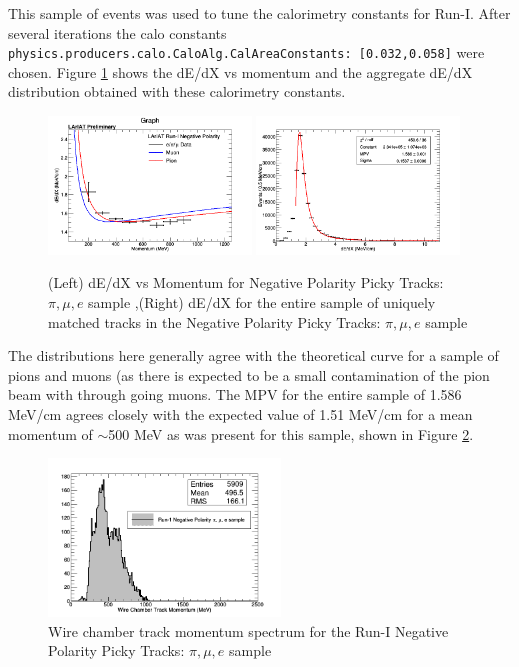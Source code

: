 This sample of events was used to tune the calorimetry constants for Run-I. After several iterations the calo constants \verb!physics.producers.calo.CaloAlg.CalAreaConstants: [0.032,0.058]! were chosen. Figure \ref{fig:Run1NegPickyTrkPiMuEResults} shows the dE/dX vs momentum and the aggregate dE/dX distribution obtained with these calorimetry constants.

\begin{figure}[htb]
\centering
\includegraphics[width=0.48\textwidth]{images/dEdXvsMomentumNegPolRun1FineBin2.png}
\includegraphics[width=0.48\textwidth]{images/dEdXNegPolRun1.png}
\caption{(Left) dE/dX vs Momentum for Negative Polarity Picky Tracks: $\pi, \mu, e$ sample ,(Right) dE/dX for the entire sample of uniquely matched tracks in the Negative Polarity Picky Tracks: $\pi, \mu, e$ sample }
\label{fig:Run1NegPickyTrkPiMuEResults}
\end{figure}

The distributions here generally agree with the theoretical curve for a sample of pions and muons (as there is expected to be a small contamination of the pion beam with through going muons. The MPV for the entire sample of 1.586 MeV/cm agrees closely with the expected value of 1.51 MeV/cm for a mean momentum of $\sim$500 MeV as was present for this sample, shown in Figure \ref{fig:Run1NegPickyTrkPiMuEMomentumSpec}.

\begin{figure}[htb]
\centering
\includegraphics[width=0.55\textwidth]{images/WCTrkMomentumRun1NegPiMuE.png}
\caption{Wire chamber track momentum spectrum for the Run-I Negative Polarity Picky Tracks: $\pi, \mu, e$ sample  }
\label{fig:Run1NegPickyTrkPiMuEMomentumSpec}
\end{figure}

